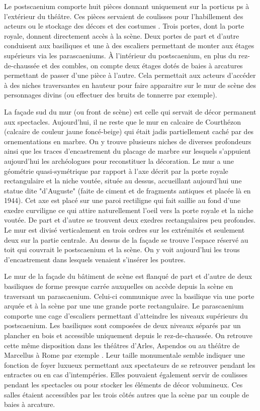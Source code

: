 		Le \gls{postscaenium} comporte huit pièces donnant uniquement sur la \gls{porticus ps} à l'extérieur du théâtre. Ces pièces servaient de coulisses pour l'habillement des acteurs ou le stockage des décors et des costumes \cite[p. 56]{formige}. Trois portes, dont la porte royale, donnent directement accès à la scène. Deux portes de part et d'autre conduisent aux \glspl{basilique} et une à des escaliers permettant de monter aux étages supérieurs via les \glspl{parascaenium}. À l'intérieur du \gls{postscaenium}, en plus du rez-de-chaussée et des combles, on compte deux étages dotés de baies à arcatures permettant de passer d'une pièce à l'autre. Cela permettait aux acteurs d'accéder à des niches traversantes en hauteur pour faire apparaitre sur le mur de scène des personnages divins (ou effectuer des bruits de tonnerre par exemple).
		
		La façade sud du mur (ou front de scène) est celle qui servait de décor permanent aux spectacles. Aujourd'hui, il ne reste que le mur en calcaire de Courthézon (calcaire de couleur jaune foncé-beige) qui était jadis partiellement caché par des ornementations en marbre. On y trouve plusieurs niches de diverses profondeurs ainsi que les traces d'encastrement du placage de marbre sur lesquels s'appuient aujourd'hui les archéologues pour reconstituer la décoration. Le mur a une géométrie quasi-symétrique par rapport à l'axe décrit par la porte royale rectangulaire et la niche voutée, située au dessus, accueillant aujourd'hui une statue dite "d'Auguste" (faite de ciment et de fragments antiques et placée là en 1944). Cet axe est placé sur une paroi rectiligne qui fait saillie au fond d'une \gls{exedre} curviligne ce qui attire naturellement l'oeil vers la porte royale et la niche voutée. De part et d'autre se trouvent deux \glspl{exedre} rectangulaires peu profondes. Le mur est divisé verticalement en trois ordres sur les extrémités et seulement deux sur la partie centrale. Au dessus de la façade se trouve l'espace réservé au toit qui couvrait le \gls{postscaenium} et la scène. On y voit aujourd'hui les trous d'encastrement dans lesquels venaient s'insérer les poutres.
		
		Le mur de la façade du bâtiment de scène est flanqué de part et d'autre de deux \glspl{basilique} de forme presque carrée auxquelles on accède depuis la scène en traversant un \gls{parascaenium}. Celui-ci communique avec la basilique via une porte arquée et à la scène par une une grande porte rectangulaire. Le \gls{parascaenium} comporte une cage d'escaliers permettant d'atteindre les niveaux supérieurs du \gls{postscaenium}. Les \glspl{basilique} sont composées de deux niveaux séparés par un plancher en bois et accessible uniquement depuis le rez-de-chaussée. On retrouve cette même disposition dans les théâtres d'Arles, Aspendos ou au théâtre de Marcellus à Rome par exemple \cite[p. 35]{formige}. Leur taille monumentale semble indiquer une fonction de foyer luxueux permettant aux spectateurs de se retrouver pendant les entractes ou en cas d'intempéries. Elles pouvaient également servir de coulisses pendant les spectacles ou pour stocker les éléments de décor volumineux. Ces salles étaient accessibles par les trois côtés autres que la scène par un couple de baies à arcature. 
				
